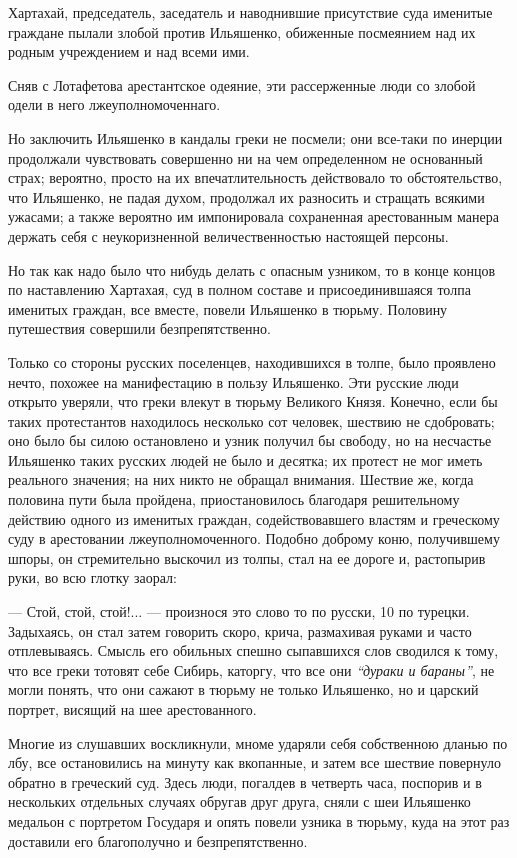 \documentclass[a4paper,20pt]{report}
\begin{document}
Хартахай, председатель, заседатель и наводнившие присутствие суда именитые граждане пылали
злобой против Ильяшенко, обиженные посмеянием над их родным учреждением и над всеми ими. 

Сняв с Лотафетова арестантское одеяние, эти рассерженные люди 
со злобой одели в него лжеуполномоченнаго.

Но заключить Ильяшенко в кандалы греки не посмели; они все-таки по инерции
продолжали чувствовать совершенно ни на чем определенном не основанный страх;
вероятно, просто на их впечатлительность действовало то обстоятельство, что
Ильяшенко, не падая духом, продолжал их разносить и стращать всякими ужасами; а
также вероятно им импонировала сохраненная арестованным манера держать себя с
неукоризненной величественностью настоящей персоны.

Но так как надо было что нибудь делать с опасным узником, 
то в конце концов по наставлению Хартахая, 
суд в полном составе и присоединившаяся толпа
именитых граждан, все вместе, повели Ильяшенко в
тюрьму. Половину путешествия совершили безпрепятственно.

Только со стороны русских поселенцев, находившихся в толпе, было проявлено
нечто, похожее на манифестацию в пользу Ильяшенко. Эти русские люди открыто
уверяли, что греки влекут в тюрьму Великого Князя.  Конечно, если бы таких
протестантов находилось несколько сот человек, шествию не сдобровать; оно было
бы силою остановлено и узник получил бы свободу, но на несчастье Ильяшенко
таких русских людей не было и десятка; их протест не мог иметь реального
значения; на них никто не обращал внимания. Шествие же, когда половина пути
была пройдена, приостановилось благодаря решительному
действию одного из именитых граждан, содействовавшего
властям и греческому суду в арестовании лжеуполномоченного. 
Подобно доброму коню, получившему шпоры, он
стремительно выскочил из толпы, стал на ее дороге и,
растопырив руки, во всю глотку заорал:

— Стой, стой, стой!... — произнося это слово то по русски, 10 по турецки.
Задыхаясь, он стал затем говорить скоро, крича, размахивая руками и часто
отплевываясь. Смысль его обильных спешно сыпавшихся слов сводился к тому, что
все греки тотовят себе Сибирь, каторгу, что все они \emph{``дураки и бараны''},
не могли понять, что они сажают в тюрьму не только Ильяшенко, но и царский
портрет, висящий на шее арестованного.

Многие из слушавших воскликнули, мноме ударяли себя собственною дланью по лбу, все остановились
на минуту как вкопанные, и затем все шествие повернуло
обратно в греческий суд.  Здесь люди, погалдев в четверть
часа, поспорив и в нескольких отдельных случаях обругав друг друга, сняли с шеи Ильяшенко медальон с портретом
Государя и опять повели узника в тюрьму,
куда на этот раз доставили его благополучно и безпрепятственно.
\end{document}
